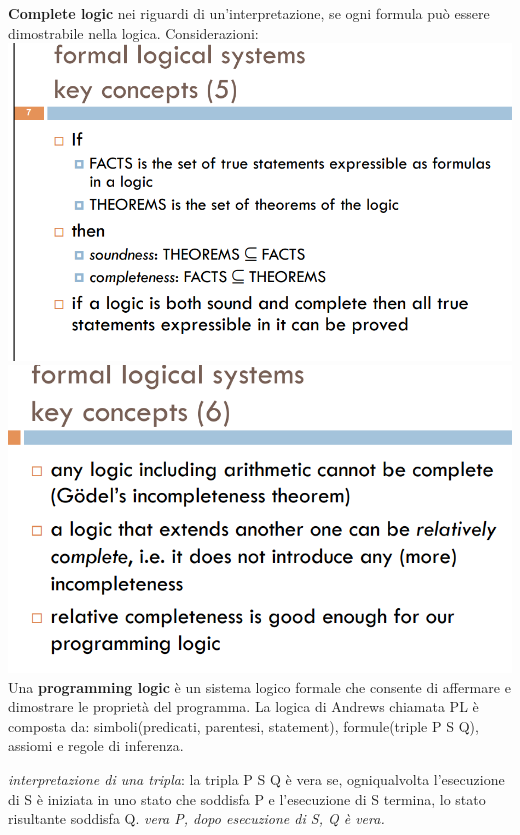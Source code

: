 \documentclass[10pt,a4paper]{book}
\begin{document}
\textbf{Complete logic} nei riguardi di un'interpretazione, se ogni formula può essere dimostrabile nella logica.
\newpage
Considerazioni:\\
\includegraphics[scale=0.45]{img/considerazioni.png} \\
\includegraphics[scale=0.45]{img/considerazioni2.png} \\
\newpage
Una \textbf{programming logic} è un sistema logico formale che consente di affermare e dimostrare le proprietà del programma.
La logica di Andrews chiamata PL è composta da: simboli(predicati, parentesi, statement), formule(triple {P} S {Q}), assiomi e regole di inferenza.

\textit{interpretazione di una tripla}: la tripla {P} S {Q} è vera se, ogniqualvolta l'esecuzione di S è iniziata in uno stato che soddisfa P e l'esecuzione di S termina, lo stato risultante soddisfa Q.
\textit{vera P, dopo esecuzione di S, Q è vera.}
\end{document}
